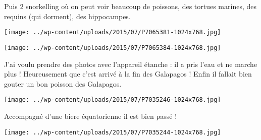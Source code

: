  \newline
 Puis 2 snorkelling où on peut voir beaucoup de poissons, des tortues marines, des requins (qui dorment), des hippocampes. \newline
 \newline
\centerline{\texttt{[image: ../wp-content/uploads/2015/07/P7065381-1024x768.jpg]} } 
 \newline
 \newline
\centerline{\texttt{[image: ../wp-content/uploads/2015/07/P7065384-1024x768.jpg]} } 
 \newline
 J'ai voulu prendre des photos avec l'appareil étanche : il a pris l'eau et ne marche plus ! Heureusement que c'est arrivé à la fin des Galapagos ! \newline
 Enfin il fallait bien gouter un bon poisson des Galapagos. \newline
 \newline
\centerline{\texttt{[image: ../wp-content/uploads/2015/07/P7035246-1024x768.jpg]} } 
 \newline
 Accompagné d'une biere équatorienne il est bien passé ! \newline
 \newline
\centerline{\texttt{[image: ../wp-content/uploads/2015/07/P7035244-1024x768.jpg]} } 
 \newline

\newpage
 
